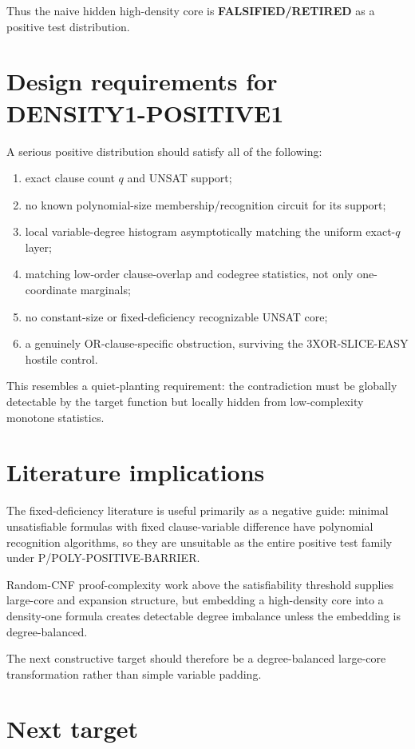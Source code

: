 \documentclass[11pt]{article}
\begin{document}
Thus the naive hidden high-density core is \textbf{FALSIFIED/RETIRED} as a positive test distribution.

\section{Design requirements for DENSITY1-POSITIVE1}

A serious positive distribution should satisfy all of the following:
\begin{enumerate}
\item exact clause count \(q\) and UNSAT support;
\item no known polynomial-size membership/recognition circuit for its support;
\item local variable-degree histogram asymptotically matching the uniform exact-\(q\) layer;
\item matching low-order clause-overlap and codegree statistics, not only one-coordinate marginals;
\item no constant-size or fixed-deficiency recognizable UNSAT core;
\item a genuinely OR-clause-specific obstruction, surviving the 3XOR-SLICE-EASY hostile control.
\end{enumerate}

This resembles a quiet-planting requirement: the contradiction must be globally detectable by the target function but locally hidden from low-complexity monotone statistics.

\section{Literature implications}

The fixed-deficiency literature is useful primarily as a negative guide: minimal unsatisfiable formulas with fixed clause-variable difference have polynomial recognition algorithms, so they are unsuitable as the entire positive test family under P/POLY-POSITIVE-BARRIER.

Random-CNF proof-complexity work above the satisfiability threshold supplies large-core and expansion structure, but embedding a high-density core into a density-one formula creates detectable degree imbalance unless the embedding is degree-balanced.

The next constructive target should therefore be a degree-balanced large-core transformation rather than simple variable padding.

\section{Next target}
\end{document}
